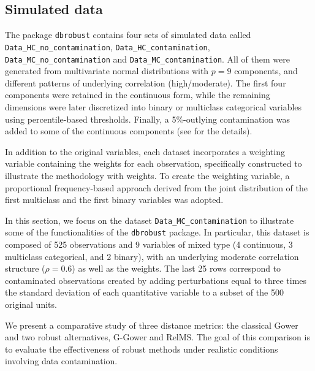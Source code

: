 \subsection{Simulated data}
The package \texttt{dbrobust} contains four sets of simulated data called \texttt{Data\_HC\_no\_contamination}, \texttt{Data\_HC\_contamination}, \texttt{Data\_MC\_no\_contamination} and \texttt{Data\_MC\_contamination}. All of them were generated from multivariate normal distributions with $p = 9$ components, and different patterns of underlying correlation (high/moderate). The first four components were retained in the continuous form, while the remaining dimensions were later discretized into binary or multiclass categorical variables using percentile-based thresholds. Finally, a 5\%-outlying contamination was added to some of the continuous components (see \citealp{boj2024robustification} for the details).

In addition to the original variables, each dataset incorporates a weighting variable containing the weights for each observation, specifically constructed to illustrate the methodology with weights. To create the weighting variable, a proportional frequency-based approach derived from the joint distribution of the first multiclass and the first binary variables was adopted.

In this section, we focus on the dataset \texttt{Data\_MC\_contamination} to illustrate some of the functionalities of the \texttt{dbrobust} package. In particular, this dataset is composed of 525 observations and 9 variables of mixed type (4 continuous, 3 multiclass categorical, and 2 binary), with an underlying moderate correlation structure ($\rho = 0.6$) as well as the weights. The last 25 rows correspond to contaminated observations created by adding perturbations equal to three times the standard deviation of each quantitative variable to a subset of the 500 original units.

We present a comparative study of three distance metrics: the classical Gower and two robust alternatives, G-Gower and RelMS. The goal of this comparison is to evaluate the effectiveness of robust methods under realistic conditions involving data contamination.

